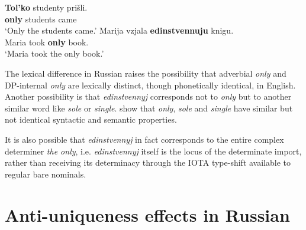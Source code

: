 \documentclass{article}
\begin{document}
\begin{exe}
	\ex \label{only-tolko} \gll \textbf{Tol'ko} studenty pri\v{s}li.\\
	\textbf{only} students came\\
	\glt `Only the students came.'
	\ex \label{only-edin} \gll Marija vzjala \textbf{edinstvennuju} knigu.\\
	Maria took \textbf{only} book.\\
	\glt `Maria took the only book.'
\end{exe}

The lexical difference in Russian raises the possibility that adverbial \textit{only} and DP-internal \textit{only} are lexically distinct, though phonetically identical, in English. Another possibility is that \textit{edinstvennyj} corresponds not to \textit{only} but to another similar word like \textit{sole} or \textit{single}. \citet{cb2012a} show that \textit{only}, \textit{sole} and \textit{single} have similar but not identical syntactic and semantic properties.

It is also possible that \textit{edinstvennyj} in fact corresponds to the entire complex determiner \textit{the only}, i.e. \textit{edinstvennyj} itself is the locus of the determinate import, rather than receiving its determinacy through the \textsc{IOTA} type-shift available to regular bare nominals.



\section{Anti-uniqueness effects in Russian \label{sec:anti-uniqueness}}
\begin{comment}
The second object position of \textit{consider} is a diagnostic for type $\langle e, t \rangle$ in English.

\begin{exe}
	\ex John considers Dr. Jekyll a madman.
	\ex[*] {John considers Dr. Jekyll Mr. Hyde.}
\end{exe}

In Russian the verb \textit{schitat'} `consider'

\begin{exe}
	\ex \gll Ivan schitaet Napoleona velichajshim frantsuzskim soldatom.\\
	Ivan considers Napoleon greatest French soldier\\
	`Ivan considers Napoleon the greatest French soldier.'
	\ex \gll Ivan schitaet Napoleona Borisom.\\
	Ivan considers Napoleon Boris\\
	`Ivan considers Napoleon to be the same person as Boris.'
\end{exe}
\end{comment}
\end{document}
